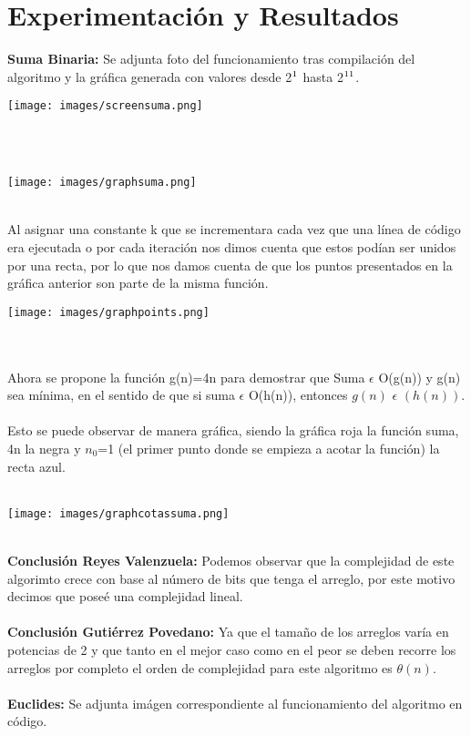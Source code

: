 \documentclass[12pt,twoside]{article}
\begin{document}
\section{Experimentaci\'on y Resultados}
{\bf Suma Binaria:} Se adjunta foto del funcionamiento tras compilaci\'on del algoritmo y la gr\'afica generada con valores desde 2$\textsuperscript{1}$ hasta 2$\textsuperscript{11}$.\\
\centerline{\texttt{[image: images/screensuma.png]}}\\\\
\centerline{\texttt{[image: images/graphsuma.png]}}\\
Al asignar una constante k que se incrementara cada vez que una l\'inea de c\'odigo era ejecutada o por cada iteraci\'on nos dimos cuenta que estos pod\'ian ser unidos por una recta, por lo que nos damos cuenta de que los puntos presentados en la gr\'afica anterior son parte de la misma funci\'on.\\
\centerline{\texttt{[image: images/graphpoints.png]}}\\\\
Ahora se propone la funci\'on g(n)=4n para demostrar que Suma $\epsilon$ O(g(n)) y g(n) sea m\'inima, en el
sentido de que si suma $\epsilon$ O(h(n)), entonces $g(n)$ $\epsilon$ $(h(n)).$\\\\
Esto se puede observar de manera gr\'afica, siendo la gr\'afica roja la funci\'on suma, 4n la negra y $n_{0}$=1 (el primer punto donde se empieza a acotar la funci\'on) la recta azul. \\\\
\centerline{\texttt{[image: images/graphcotassuma.png]}}\\
{\bf Conclusi\'on Reyes Valenzuela:} Podemos observar que la complejidad de este algorimto crece con base al n\'umero de bits que tenga el arreglo, por este motivo decimos que pose\'e una complejidad lineal.\\\\
{\bf Conclusi\'on Guti\'errez Povedano:} Ya que el tama\~{n}o de los arreglos var\'ia en potencias de 2 y que tanto en el mejor caso como en el peor se deben recorre los arreglos por completo el orden de complejidad para este algoritmo es $\theta(n)$.\\\\
{\bf Euclides:} Se adjunta im\'agen correspondiente al funcionamiento del algoritmo en c\'odigo.\\\\
\end{document}
